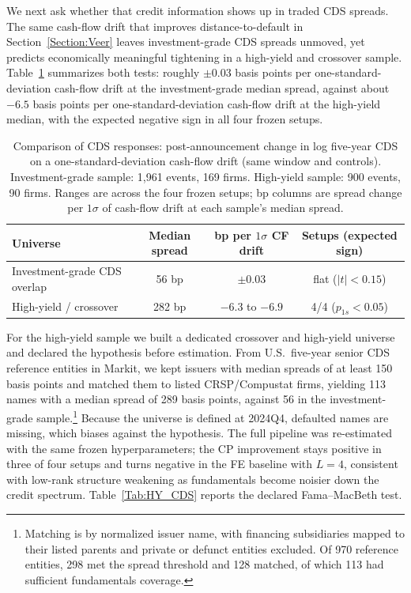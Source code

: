 \documentclass[pdflatex,sn-mathphys-num]{sn-jnl}%
\theoremstyle{thmstyleone}%
\theoremstyle{thmstyletwo}%
\theoremstyle{thmstylethree}%
\begin{document}
We next ask whether that credit information shows up in traded CDS spreads. The same cash-flow drift that improves distance-to-default in Section~\ref{Section:Veer} leaves investment-grade CDS spreads unmoved, yet predicts economically meaningful tightening in a high-yield and crossover sample. Table~\ref{Tab:CDS_IG_vs_HY} summarizes both tests: roughly $\pm 0.03$ basis points per one-standard-deviation cash-flow drift at the investment-grade median spread, against about $-6.5$ basis points per one-standard-deviation cash-flow drift at the high-yield median, with the expected negative sign in all four frozen setups.

\begin{table}[!htbp]
\centering
\caption{Comparison of CDS responses: post-announcement change in log five-year CDS on a one-standard-deviation cash-flow drift (same window and controls). Investment-grade sample: 1{,}961 events, 169 firms. High-yield sample: 900 events, 90 firms. Ranges are across the four frozen setups; bp columns are spread change per $1\sigma$ of cash-flow drift at each sample's median spread.}
\label{Tab:CDS_IG_vs_HY}
\begin{tabular}{lccc}
\toprule
Universe & Median spread & bp per $1\sigma$ CF drift & Setups (expected sign) \\
\midrule
Investment-grade CDS overlap & 56 bp & $\pm 0.03$ & flat ($|t|<0.15$) \\
High-yield / crossover & 282 bp & $-6.3$ to $-6.9$ & 4/4 ($p_{1s}<0.05$) \\
\bottomrule
\end{tabular}
\end{table}

For the high-yield sample we built a dedicated crossover and high-yield universe and declared the hypothesis before estimation. From U.S.\ five-year senior CDS reference entities in Markit, we kept issuers with median spreads of at least 150 basis points and matched them to listed CRSP/Compustat firms, yielding 113 names with a median spread of 289 basis points, against 56 in the investment-grade sample.\footnote{Matching is by normalized issuer name, with financing subsidiaries mapped to their listed parents and private or defunct entities excluded. Of 970 reference entities, 298 met the spread threshold and 128 matched, of which 113 had sufficient fundamentals coverage.} Because the universe is defined at 2024Q4, defaulted names are missing, which biases against the hypothesis. The full pipeline was re-estimated with the same frozen hyperparameters; the CP improvement stays positive in three of four setups and turns negative in the FE baseline with $L=4$, consistent with low-rank structure weakening as fundamentals become noisier down the credit spectrum. Table~\ref{Tab:HY_CDS} reports the declared Fama--MacBeth test.
\end{document}
